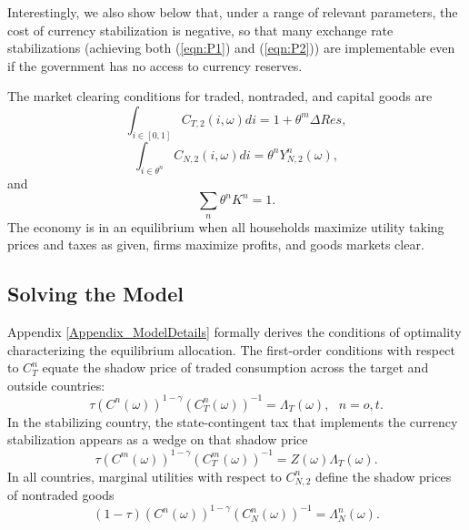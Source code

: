 \documentclass[12pt,letter]{article}
\theoremstyle{break} \theorembodyfont{\normalfont\itshape}
\theoremstyle{break}
\theoremstyle{break} \theorembodyfont{\normalfont\itshape}
\theoremstyle{break} \theorembodyfont{\normalfont\itshape}
\begin{document}
Interestingly, we also show below that, under a range of relevant
parameters, the cost of currency stabilization is negative, so that
many exchange rate stabilizations (achieving both (\ref{eqn:P1}) and
(\ref{eqn:P2})) are implementable even if the government has no access
to currency reserves.

The market clearing conditions for traded, nontraded, and capital
goods are
\begin{equation}
  \int_{i \in [0, 1]} C_{T, 2}(i, \omega) di =1 +\theta^m \Delta Res,
  \label{eqn:RCT}
\end{equation}
\begin{equation}
  \int_{i \in \theta^n} C_{N, 2}(i, \omega) di = \theta^n Y_{N, 2}^n(\omega),
  \label{eqn:RCN}
\end{equation}
and
\begin{equation}
  \sum_n \theta^n K^n = 1. 
  \label{eqn:RCK}
\end{equation}
The economy is in an equilibrium when all households maximize utility
taking prices and taxes as given, firms maximize profits, and goods
markets clear.


\subsection{Solving the Model\label{sec:solving}}


Appendix \ref{Appendix_ModelDetails} formally derives the conditions
of optimality characterizing the equilibrium allocation. The
first-order conditions with respect to $C_T^n$ equate the shadow price
of traded consumption across the target and outside countries:
\begin{equation}
  \tau \left( C^n(\omega) \right)^{1-\gamma} 
  \left( C_T^n(\omega) \right)^{- 1} =  \Lambda_T(\omega),\mbox{ }n=o,t. 
  \label{eqn:FOCCT}
\end{equation}
In the stabilizing country, the state-contingent tax that implements
the currency stabilization appears as a wedge on that shadow price
\begin{equation}
  \tau \left( C^m(\omega) \right)^{1-\gamma} 
  \left( C_T^m(\omega) \right)^{- 1} = Z(\omega) \Lambda_T(\omega). 
  \label{eqn:FOCCPT}
\end{equation}
In all countries, marginal utilities with respect to $C_{N, 2}^n$
define the shadow prices of nontraded goods
\begin{equation}
  (1 - \tau)  \left( C^n(\omega) \right)^{1-\gamma} 
  \left( C_N^n(\omega) \right)^{- 1} = \Lambda_N^n(\omega).
  \label{eqn:FOCCN}
\end{equation}
\end{document}
